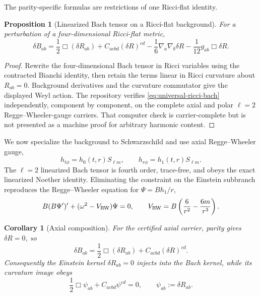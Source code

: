 \documentclass[11pt]{article}
\newtheorem{proposition}[theorem]{Proposition}
\newtheorem{corollary}[theorem]{Corollary}
\theoremstyle{definition}
\theoremstyle{remark}
\begin{document}
The parity-specific formulas are restrictions of one Ricci-flat identity.

\begin{proposition}[Linearized Bach tensor on a Ricci-flat background]
\label{prop:universal-ricci-bach}
For a perturbation of a four-dimensional Ricci-flat metric,
\begin{equation}\label{eq:universal-ricci-bach}
 \delta B_{ab}=\frac12\Box(\delta R_{ab})
 +C_{acbd}(\delta R)^{cd}
 -\frac16\nabla_a\nabla_b\delta R
 -\frac1{12}g_{ab}\Box\delta R.
\end{equation}
\end{proposition}

\begin{proof}
Rewrite the four-dimensional Bach tensor in Ricci variables using the
contracted Bianchi identity, then retain the terms linear in Ricci curvature
about \(R_{ab}=0\).  Background derivatives and the curvature commutator give
the displayed Weyl action.  The repository verifies
\eqref{eq:universal-ricci-bach} independently, component by component, on the
complete axial and polar \(\ell=2\) Regge--Wheeler-gauge carriers.  That
computer check is carrier-complete but is not presented as a machine proof
for arbitrary harmonic content.
\end{proof}

We now specialize the background to Schwarzschild and use axial
Regge--Wheeler gauge,
\[
 h_{t\phi}=h_0(t,r)S_{\ell m},
 \qquad
 h_{r\phi}=h_1(t,r)S_{\ell m}.
\]
The \(\ell=2\) linearized Bach tensor is fourth order, trace-free, and obeys
the exact linearized Noether identity.  Eliminating the constraint on the
Einstein subbranch reproduces the Regge--Wheeler equation for
\(\Psi=Bh_1/r\),
\begin{equation}
 B(B\Psi')'+(\omega^2-V_{\rm RW})\Psi=0,
 \qquad
 V_{\rm RW}=B\left(\frac6{r^2}-\frac{6m}{r^3}\right).
\end{equation}

\begin{corollary}[Axial composition]
For the certified axial carrier, parity gives \(\delta R=0\), so
\begin{equation}\label{eq:axial-split}
 \boxed{\delta B_{ab}
 =\frac12\Box(\delta R_{ab})
  +C_{acbd}(\delta R)^{cd}.}
\end{equation}
Consequently the Einstein kernel \(\delta R_{ab}=0\) injects into the Bach
kernel, while its curvature image obeys
\begin{equation}
 \frac12\Box\psi_{ab}+C_{acbd}\psi^{cd}=0,
 \qquad \psi_{ab}:=\delta R_{ab}.
\end{equation}
\end{corollary}
\end{document}
